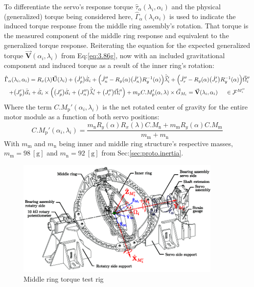 \par
To differentiate the servo's response torque $\hat{\tau}_\alpha(\lambda_i,\alpha_i)$ and the physical (generalized) torque being considered here, $\hat{\Gamma}_\alpha(\lambda_i\alpha_i)$ is used to indicate the induced torque response from the middle ring assembly's rotation. That torque is the measured component of the middle ring response and equivalent to the generalized torque response. Reiterating the equation for the expected generalized torque $\vec{\mathbf{V}}(\alpha_i,\lambda_i)$ from Eq:\ref{eq:3.86g}, now with an included gravitational component and induced torque as a result of the inner ring's rotation:
\begin{multline} \label{eq:model-middle}
\hat{\Gamma}_\alpha(\lambda_i,\alpha_i)=R_x(\lambda)\vec{\mathbf{U}}(\lambda_i)+\big(\dot{J}_p'\big)\dot{\vec{\alpha}}_i+\Big(\dot{J}_n''-R_y(\alpha)\big(\dot{J}_n'\big)R_y^{-1}(\alpha)\Big)\dot{\vec{\lambda}}_i'+\Big(\dot{J}_r''-R_y(\alpha)\big(\dot{J}_r'\big)R_y^{-1}(\alpha)\Big)\vec{\Omega}_i''
\\
+\big(J_\text{p}'\big)\ddot{\vec{\alpha}}_i+\dot{\vec{\alpha}}_i\times \Big(\big(J_p'\big)\dot{\vec{\alpha}}_i+\big(J_n''\big)\dot{\vec{\lambda}}_i\hspace{-2pt}'+\big(J_r''\big)\vec{\Omega}_i\hspace{-2pt}''\Big)+m_\text{p}C.M'_{\text{p}}(\alpha,\lambda)\times\vec{G}_{M_i}=\vec{\mathbf{V}}(\lambda_i,\alpha_i)~~~~\in\mathcal{F}^{M_i''}
\end{multline}
Where the term $C.M_{\text{p}}'(\alpha_i,\lambda_i)$ is the net rotated center of gravity for the entire motor module as a function of both servo positions:
\begin{equation}
C.M_\text{p}'(\alpha_i,\lambda_i)=\frac{m_\text{n}R_y(\alpha)R_x(\lambda)C.M_\text{n}+m_\text{m}R_y(\alpha)C.M_\text{m}}{m_\text{m}+m_\text{n}}
\end{equation}
With $m_\text{m}$ and $m_\text{n}$ being inner and middle ring structure's respective masses, $m_\text{m}=98~[\text{g}]$ and $m_\text{n}=92~[\text{g}]$ from Sec:\ref{sec:proto.inertia}.
\par
\begin{figure}[htbp]
\centering
\includegraphics[width=0.90\textwidth]{figs/torque-middle}
\caption{Middle ring torque test rig}
\label{fig:torque-middle}
\vspace{-6pt}
\end{figure}
